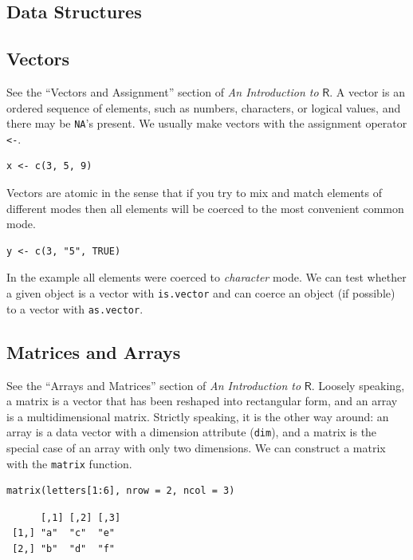 \documentclass[captions=tableheading]{scrbook}
\begin{document}
\begin{example}
\section{Data Structures}
\label{sec-20-1}
\label{sec-Data-Structures}
\subsection{Vectors}
\label{sec-20-1-1}


See the ``Vectors and Assignment'' section of \emph{An Introduction to} \(\mathsf{R}\). A vector is an ordered sequence of elements, such as numbers, characters, or logical values, and there may be \texttt{NA}'s present. We usually make vectors with the assignment operator \texttt{<-}.


\begin{verbatim}
x <- c(3, 5, 9)
\end{verbatim}


Vectors are atomic in the sense that if you try to mix and match elements of different modes then all elements will be coerced to the most convenient common mode.


\begin{verbatim}
y <- c(3, "5", TRUE)
\end{verbatim}


In the example all elements were coerced to \emph{character} mode. We can test whether a given object is a vector with \texttt{is.vector} and can coerce an object (if possible) to a vector with \texttt{as.vector}.
\subsection{Matrices and Arrays}
\label{sec-20-1-2}


See the ``Arrays and Matrices'' section of \emph{An Introduction to} \(\mathsf{R}\). Loosely speaking, a matrix is a vector that has been reshaped into rectangular form, and an array is a multidimensional matrix. Strictly speaking, it is the other way around: an array is a data vector with a dimension attribute (\texttt{dim}), and a matrix is the special case of an array with only two dimensions. We can construct a matrix with the \texttt{matrix} function. 


\begin{verbatim}
matrix(letters[1:6], nrow = 2, ncol = 3)
\end{verbatim}

\begin{verbatim}
      [,1] [,2] [,3]
 [1,] "a"  "c"  "e" 
 [2,] "b"  "d"  "f"
\end{verbatim}


\end{example}
\end{document}
